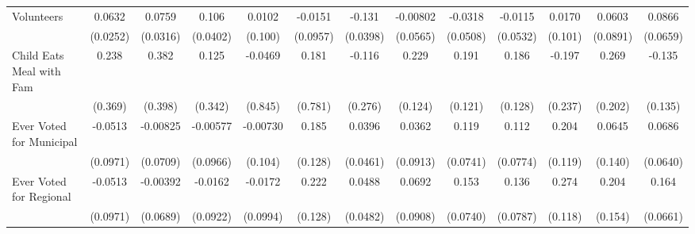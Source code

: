 {\begin{tabular}{l*{12}{c}}
\addlinespace
Volunteers  &      0.0632\sym{*}  &      0.0759\sym{*}  &       0.106\sym{**} &      0.0102         &     -0.0151         &      -0.131\sym{**} &    -0.00802         &     -0.0318         &     -0.0115         &      0.0170         &      0.0603         &      0.0866         \\
            &    (0.0252)         &    (0.0316)         &    (0.0402)         &     (0.100)         &    (0.0957)         &    (0.0398)         &    (0.0565)         &    (0.0508)         &    (0.0532)         &     (0.101)         &    (0.0891)         &    (0.0659)         \\
\addlinespace
Child Eats Meal with Fam&       0.238         &       0.382         &       0.125         &     -0.0469         &       0.181         &      -0.116         &       0.229         &       0.191         &       0.186         &      -0.197         &       0.269         &      -0.135         \\
            &     (0.369)         &     (0.398)         &     (0.342)         &     (0.845)         &     (0.781)         &     (0.276)         &     (0.124)         &     (0.121)         &     (0.128)         &     (0.237)         &     (0.202)         &     (0.135)         \\
\addlinespace
Ever Voted for Municipal&     -0.0513         &    -0.00825         &    -0.00577         &    -0.00730         &       0.185         &      0.0396         &      0.0362         &       0.119         &       0.112         &       0.204         &      0.0645         &      0.0686         \\
            &    (0.0971)         &    (0.0709)         &    (0.0966)         &     (0.104)         &     (0.128)         &    (0.0461)         &    (0.0913)         &    (0.0741)         &    (0.0774)         &     (0.119)         &     (0.140)         &    (0.0640)         \\
\addlinespace
Ever Voted for Regional&     -0.0513         &    -0.00392         &     -0.0162         &     -0.0172         &       0.222         &      0.0488         &      0.0692         &       0.153\sym{*}  &       0.136         &       0.274\sym{*}  &       0.204         &       0.164\sym{*}  \\
            &    (0.0971)         &    (0.0689)         &    (0.0922)         &    (0.0994)         &     (0.128)         &    (0.0482)         &    (0.0908)         &    (0.0740)         &    (0.0787)         &     (0.118)         &     (0.154)         &    (0.0661)         \\

\end{tabular}}
